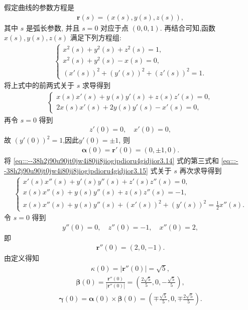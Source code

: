 \documentclass[../../main.tex]{subfiles}%
\begin{document}
\begin{solution}
假定曲线的参数方程是
\begin{align*}
\bm{r}(s) = (x(s), y(s), z(s)),
\end{align*}
其中 $s$ 是弧长参数, 并且 $s=0$ 对应于点 $(0,0,1)$. 再结合可知,函数 $x(s), y(s), z(s)$ 满足下列方程组:
\begin{align}
\begin{cases}
x^2(s) + y^2(s) + z^2(s) = 1, \\
x^2(s) + y^2(s) - x(s) = 0, \\
(x'(s))^2 + (y'(s))^2 + (z'(s))^2 = 1.
\end{cases}
\label{eq:::--38h2j90u90jt0jw4i80ji8jiogjpdioru4gidjior3.14}
\end{align}
将上式中的前两式关于 $s$ 求导得到
\begin{align}
\begin{cases}
x(s)x'(s) + y(s)y'(s) + z(s)z'(s) = 0, \\
2x(s)x'(s) + 2y(s)y'(s) - x'(s) = 0,
\end{cases}
\label{eq:::--38h2j90u90jt0jw4i80ji8jiogjpdioru4gidjior3.15}
\end{align}
再令 $s=0$ 得到
\begin{align*}
z'(0) = 0, \quad x'(0) = 0,
\end{align*}
故 $(y'(0))^2 = 1$,因此$y'(0)=\pm 1$, 则
\begin{align}
\bm{\alpha}(0) = \bm{r}'(0) = (0,\pm 1,0).
\label{eq:::--38h2j90u90jt0jw4i80ji8jiogjpdioru4gidjior3.16}
\end{align}
将 \eqref{eq:::--38h2j90u90jt0jw4i80ji8jiogjpdioru4gidjior3.14} 式的第三式和 \eqref{eq:::--38h2j90u90jt0jw4i80ji8jiogjpdioru4gidjior3.15} 式关于 $s$ 再次求导得到
\begin{align}
\begin{cases}
x'(s)x''(s) + y'(s)y''(s) + z'(s)z''(s) = 0, \\
x(s)x''(s) + y(s)y''(s) + z(s)z''(s) = -1, \\
x(s)x''(s) + y(s)y''(s) + (x'(s))^2 + (y'(s))^2 = \frac{1}{2}x''(s).
\end{cases}
\label{eq:::--38h2j90u90jt0jw4i80ji8jiogjpdioru4gidjior3.16_prime}
\end{align}
令 $s=0$ 得到
\begin{align*}
y''(0) = 0, \quad z''(0) = -1, \quad x''(0) = 2,
\end{align*}
即
\begin{align}
\bm{r}''(0) = (2,0,-1).
\label{eq:::--38h2j90u90jt0jw4i80ji8jiogjpdioru4gidjior3.17}
\end{align}
由定义得知
\begin{align*}
\kappa(0) = |\bm{r}''(0)| = \sqrt{5},
\end{align*}
\begin{align*}
\bm{\beta}(0) = \frac{\bm{r}''(0)}{|\bm{r}''(0)|} = \left(\frac{2\sqrt{5}}{5}, 0, -\frac{\sqrt{5}}{5}\right),
\end{align*}
\begin{align*}
\bm{\gamma}(0) = \bm{\alpha}(0) \times \bm{\beta}(0) = \left(\mp \frac{\sqrt{5}}{5}, 0, \mp \frac{2\sqrt{5}}{5}\right).
\end{align*}


\end{solution}
\end{document}
